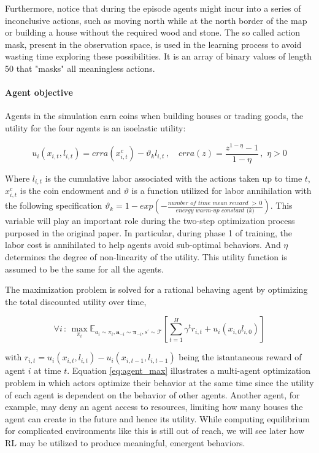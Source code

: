 Furthermore, notice that during the episode agents might incur into a series of inconclusive actions, such as moving north while at the north border of the map or building a house without the required wood and stone. The so called action mask,  present in the observation space, is used in the learning process to avoid wasting time exploring these possibilities. It is an array of binary values of length 50 that "masks" all meaningless actions.

\paragraph{Agent objective}

Agents in the simulation earn coins when building houses or trading goods, the utility for the four agents is an isoelastic utility:

\begin{equation}
u_i(x_{i,t}, l_{i,t}) = crra(x_{i,t}^c) - \vartheta_k l_{i,t}\,, \quad crra(z) = \frac{z^{1- \eta}-1}{1-\eta}\,,\,\, \eta > 0
\end{equation}

Where \( l_{i,t} \) is the cumulative labor associated with the actions taken up to time \( t \), \( x_{i,t}^c \) is the coin endowment and \( \vartheta \) is a function utilized for labor annihilation with the following specification \( \vartheta_k = 1- exp\left(- \frac{\textit{number of time mean reward }>\, 0}{\textit{energy warm-up constant (k)}}\right)\). This variable will play an important role during the two-step optimization process purposed in the original paper. In particular, during phase 1 of training, the labor cost is annihilated to help agents avoid sub-optimal behaviors. And \( \eta \) determines the degree of non-linearity of the utility. This utility function is assumed to be the same for all the agents.

The maximization problem is solved for a rational behaving agent by optimizing the total discounted utility over time,


\begin{equation}
\forall i \,:\, \max_{\pi_i}\mathbb{E}_{a_i \sim \pi_i, \boldsymbol{a}_{-i} \sim \boldsymbol{\pi}_{-i}, s^{'}\sim\mathcal{T}}\left[ \sum_{t=1}^H \gamma^t r_{i,t} + u_i({x_{i,0}l_{i,0}})\right]
\label{eq:agent_max}
\end{equation}


with \( r_{i,t} = u_i(x_{i,t},l_{i,t})  - u_i(x_{i,t-1},l_{i,t-1}) \) being the istantaneous reward of agent \( i \) at time \( t \). Equation \ref{eq:agent_max} illustrates a multi-agent optimization problem in which actors optimize their behavior at the same time since the utility of each agent is dependent on the behavior of other agents. Another agent, for example, may deny an agent access to resources, limiting how many houses the agent can create in the future and hence its utility. While computing equilibrium for complicated environments like this is still out of reach, we will see later how RL may be utilized to produce meaningful, emergent behaviors.


